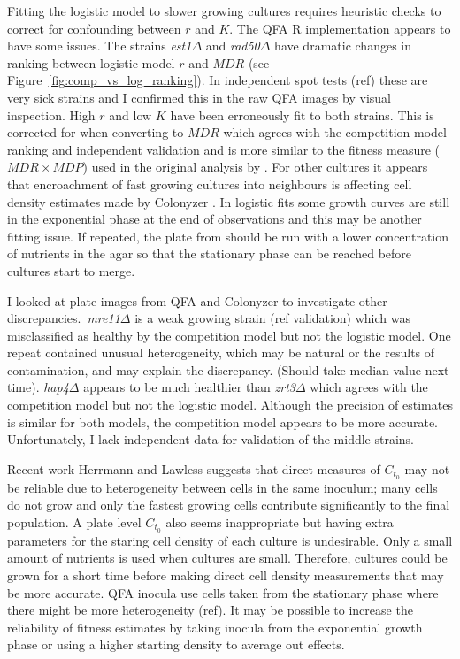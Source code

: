 Fitting the logistic model to slower growing cultures requires
heuristic checks to correct for confounding between \(r\) and
\(K\). The QFA R implementation appears to have some issues. The
strains \textit{est1\(\Delta\)} and \textit{rad50\(\Delta\)} have
dramatic changes in ranking between logistic model \(r\) and \(MDR\)
(see Figure~\ref{fig:comp_vs_log_ranking}). In independent spot tests
(ref) these are very sick strains and I confirmed this in the raw QFA
images by visual inspection. High \(r\) and low \(K\) have been
erroneously fit to both strains. This is corrected for when converting
to \(MDR\) which agrees with the competition model ranking and
independent validation and is more similar to the fitness measure
(\(MDR \times MDP\)) used in the original analysis by
\citet{Addinall2011}. For other cultures it appears that encroachment
of fast growing cultures into neighbours is affecting cell density
estimates made by Colonyzer \citep{Lawless2010}. In logistic fits some
growth curves are still in the exponential phase at the end of
observations and this may be another fitting issue. If repeated, the
plate from \citet{Addinall2011} should be run with a lower
concentration of nutrients in the agar so that the stationary phase
can be reached before cultures start to merge.

I looked at plate images from QFA and Colonyzer to investigate other
discrepancies.~\textit{mre11\(\Delta\)} is a weak growing strain (ref
validation) which was misclassified as healthy by the competition
model but not the logistic model. One repeat contained unusual
heterogeneity, which may be natural or the results of contamination,
and may explain the discrepancy. (Should take median value next
time). \textit{hap4\(\Delta\)} appears to be much healthier
than \textit{zrt3\(\Delta\)} which agrees with the competition model
but not the logistic model. Although the precision of estimates is
similar for both models, the competition model appears to be more
accurate. Unfortunately, I lack independent data for validation of the
middle strains.

Recent work Herrmann and Lawless suggests that direct measures of
\(C_{t_{0}}\) may not be reliable due to heterogeneity between cells
in the same inoculum; many cells do not grow and only the fastest
growing cells contribute significantly to the final population. A
plate level \(C_{t_{0}}\) also seems inappropriate but having extra
parameters for the staring cell density of each culture is
undesirable. Only a small amount of nutrients is used when cultures
are small. Therefore, cultures could be grown for a short time before
making direct cell density measurements that may be more accurate. QFA
inocula use cells taken from the stationary phase where there might be
more heterogeneity (ref). It may be possible to increase the
reliability of fitness estimates by taking inocula from the
exponential growth phase or using a higher starting density to average
out effects.

